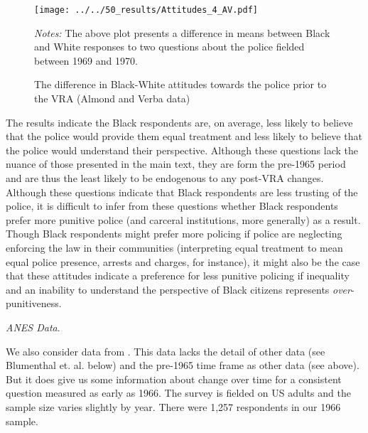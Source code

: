 \documentclass[12pt]{article}
\begin{document}
 \begin{figure}[h!]
   	\begin{center}
   	\caption{The difference in Black-White attitudes towards the police prior to the VRA (Almond and Verba data)}
   		\small \vspace*{.05in}
   		\smallskip
   			\texttt{[image: ../../50\_results/Attitudes\_4\_AV.pdf]} \\
   		\label{figure_almondverba}
   		\end{center}
  	\scriptsize{\emph{Notes:} The above plot presents a difference in means between Black and White responses to two questions about the police fielded between 1969 and 1970. }
   \end{figure} \normalsize


The results indicate the Black respondents are, on average, less likely to believe that the police would provide them equal treatment and less likely to believe that the police would understand their perspective.  Although these questions lack the nuance of those presented in the main text, they are form the pre-1965 period and are thus the least likely to be endogenous to any post-VRA changes.  Although these questions indicate that Black respondents are less trusting of the police, it is difficult to infer from these questions whether Black respondents prefer more punitive police (and carceral institutions, more generally) as a result.  Though Black respondents might prefer more policing if police are neglecting enforcing the law in their communities (interpreting equal treatment to mean equal police presence, arrests and charges, for instance), it might also be the case that these attitudes indicate a preference for less punitive policing if inequality and an inability to understand the perspective of Black citizens represents \emph{over}-punitiveness.





\vspace{.25in}
\emph{ANES Data}.

We also consider data from .  This data lacks the detail of other data (see Blumenthal et. al. below) and the pre-1965 time frame as other data (see above).  But it does give us some information about change over time for a consistent question measured as early as 1966.  The survey is fielded on US adults and the sample size varies slightly by year.  There were 1,257 respondents in our 1966 sample.
\end{document}

